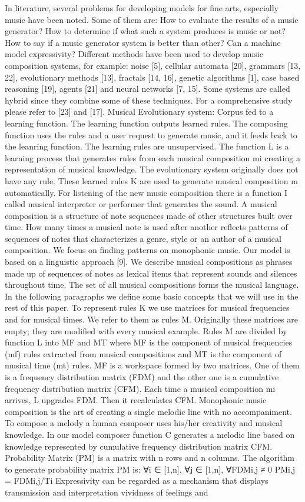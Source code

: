 In literature, several problems for developing models for fine arts, especially music have been noted. Some of them are: How to evaluate the results of a music generator? How to determine if what such a system produces is music or not? How to say if a music generator system is better than other? Can a machine model expressivity? Different methods have been used to develop music composition systems, for example: noise [5], cellular automata [20], grammars [13, 22], evolutionary methods [13], fractals [14, 16], genetic algorithms [1], case based reasoning [19], agents [21] and neural networks [7, 15]. Some systems are called hybrid since they combine some of these techniques. For a comprehensive study please refer to [23] and [17]. Musical Evolutionary system: Corpus fed to a learning function. The learning function outputs learned rules. The composing function uses the rules and a user request to generate music, and it feeds back to the leanring function. The learning rules are unsupervised. The function L is a learning process that generates rules from each musical composition mi creating a representation of musical knowledge. The evolutionary system originally does not have any rule. These learned rules K are used to generate musical composition m automatically. For listening of the new music composition there is a function I called musical interpreter or performer that generates the sound. A musical composition is a structure of note sequences made of other structures built over time. How many times a musical note is used after another reflects patterns of sequences of notes that characterizes a genre, style or an author of a musical composition. We focus on finding patterns on monophonic music. Our model is based on a linguistic approach [9]. We describe musical compositions as phrases made up of sequences of notes as lexical items that represent sounds and silences throughout time. The set of all musical compositions forms the musical language. In the following paragraphs we define some basic concepts that we will use in the rest of this paper. To represent rules K we use matrices for musical frequencies and for musical times. We refer to them as rules M. Originally these matrices are empty; they are modified with every musical example. Rules M are divided by function L into MF and MT where MF is the component of musical frequencies (mf) rules extracted from musical compositions and MT is the component of musical time (mt) rules. MF is a workspace formed by two matrices. One of them is a frequency distribution matrix (FDM) and the other one is a cumulative frequency distribution matrix (CFM). Each time a musical composition mi arrives, L upgrades FDM. Then it recalculates CFM. Monophonic music composition is the art of creating a single melodic line with no accompaniment. To compose a melody a human composer uses his/her creativity and musical knowledge. In our model composer function C generates a melodic line based on knowledge represented by cumulative frequency distribution matrix CFM. Probability Matrix (PM) is a matrix with n rows and n columns. The algorithm to generate probability matrix PM is: ∀i ∈ [1,n], ∀j ∈ [1,n], ∀FDMi,j ≠ 0 PMi,j = FDMi,j/Ti  Expressivity can be regarded as a mechanism that displays transmission and interpretation vividness of feelings and 